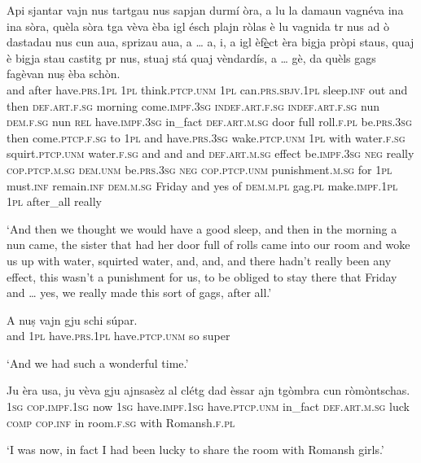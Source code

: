 \begin{linenumbers}
\gll    Api sjantar vajn nus tartgau nus sapjan durmí òra, a lu la damaun vagnéva ina ina sòra, quèla sòra tga vèva èba igl ésch plajn ròlas è lu vagnida tr nus ad ò dastadau nus cun aua, sprizau aua, a … a, i, a igl èf\underline{è}ct èra bigja pròpi staus, quaj è bigja stau castitg pr nus, stuaj stá quaj vèndardís, a … gè, da quèls gags fagèvan nuṣ èba schòn.\\
and after have.\textsc{prs.1pl} \textsc{1pl} think.\textsc{ptcp.unm} \textsc{1pl}  can.\textsc{prs.sbjv.1pl} sleep.\textsc{inf} out and then \textsc{def.art.f.sg} morning come.\textsc{impf.3sg} \textsc{indef.art.f.sg} \textsc{indef.art.f.sg} nun \textsc{dem.f.sg} nun \textsc{rel} have.\textsc{impf.3sg} in\_fact \textsc{def.art.m.sg} door full roll.\textsc{f.pl} be.\textsc{prs.3sg} then come.\textsc{ptcp.f.sg} to \textsc{1pl} and have.\textsc{prs.3sg} wake.\textsc{ptcp.unm} \textsc{1pl} with water.\textsc{f.sg} squirt.\textsc{ptcp.unm} water.\textsc{f.sg} and {} and  and {} \textsc{def.art.m.sg} effect be.\textsc{impf.3sg} \textsc{neg} really  \textsc{cop.ptcp.m.sg} \textsc{dem.unm} be.\textsc{prs.3sg} \textsc{neg} \textsc{cop.ptcp.unm} punishment.\textsc{m.sg} for \textsc{1pl} must.\textsc{inf}  remain.\textsc{inf} \textsc{dem.m.sg} Friday and {} yes of \textsc{dem.m.pl} gag.\textsc{pl} make.\textsc{impf.1pl} \textsc{1pl} after\_all really\\
\end{linenumbers}
\medskip
\glt `And then we thought we would have a good sleep, and then in the morning a nun came, the sister that had her door full of rolls came into our room and woke us up with water, squirted water, and, and, and there hadn’t really been any effect, this wasn’t a punishment for us, to be obliged to stay there that Friday and … yes, we really made this sort of gags, after all.'
\medskip

\begin{linenumbers}
\gll    A nuṣ vajn gju schi súpar.\\
and \textsc{1pl} have.\textsc{prs.1pl} have.\textsc{ptcp.unm} so super\\
\end{linenumbers}
\medskip
\glt `And we had such a wonderful time.'
\medskip

\begin{linenumbers}
\gll    Ju èra usa, ju vèva gju ajnsasèz al clétg dad èssar ajn tgòmbra cun ròmòntschas.\\
 \textsc{1sg} \textsc{cop.impf.1sg} now \textsc{1sg} have.\textsc{impf.1sg} have.\textsc{ptcp.unm} in\_fact \textsc{def.art.m.sg} luck \textsc{comp} \textsc{cop.inf} in room.\textsc{f.sg} with Romansh.\textsc{f.pl}\\
\end{linenumbers}
\medskip
\glt `I was now, in fact I had been lucky to share the room with Romansh girls.'
\medskip

